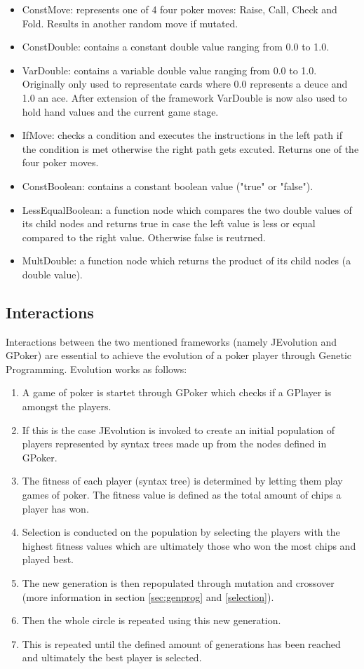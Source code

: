 \documentclass[12pt,fleqn,a4paper]{article}
\begin{document}
\begin{itemize}
	\item ConstMove: represents one of 4 four poker moves: Raise, Call, Check and Fold. Results in another random
	move if mutated.
	\item ConstDouble: contains a constant double value ranging from 0.0 to 1.0.
	\item VarDouble: contains a variable double value ranging from 0.0 to 1.0. Originally only used to representate
	cards where 0.0 represents a deuce and 1.0 an ace. After extension of the framework VarDouble is now also used to
	hold hand values and the current game stage.
	\item IfMove: checks a condition and executes the instructions in the left path if the condition is met otherwise the right path gets excuted. Returns one of the four poker moves.
	\item ConstBoolean: contains a constant boolean value ("true" or "false").
	\item LessEqualBoolean: a function node which compares the two double values of its child nodes and returns true in case the left value is less or equal compared to the right value. Otherwise false is reutrned.
	\item MultDouble: a function node which returns the product of its child nodes (a double value).
\end{itemize}

\subsection{Interactions}
Interactions between the two mentioned frameworks (namely JEvolution and GPoker) are essential to achieve the evolution of a poker player through Genetic Programming. Evolution works as follows:
\begin{enumerate}
	\item A game of poker is startet through GPoker which checks if a GPlayer is amongst the players.
	\item If this is the case JEvolution is invoked to create an initial population of players represented by syntax trees
	made up from the nodes defined in GPoker.
	\item The fitness of each player (syntax tree) is determined by letting them play games of poker. The fitness value is defined as the total amount of chips a player has won.
	\item Selection is conducted on the population by selecting the players with the highest fitness values which are ultimately those who won the most chips and played best.
	\item The new generation is then repopulated through mutation and crossover (more information in section \ref{sec:genprog} and \ref{selection}).
	\item Then the whole circle is repeated using this new generation.
	\item This is repeated until the defined amount of generations has been reached and ultimately the best player is selected.
\end{enumerate}
\end{document}
